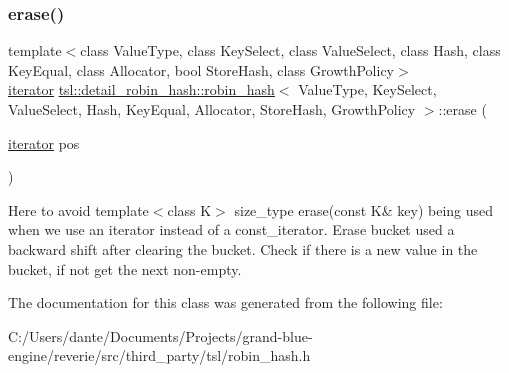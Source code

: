 \subsubsection{\texorpdfstring{erase()}{erase()}}
{\footnotesize\ttfamily template$<$class Value\+Type, class Key\+Select, class Value\+Select, class Hash, class Key\+Equal, class Allocator, bool Store\+Hash, class Growth\+Policy$>$ \\
\mbox{\hyperlink{classtsl_1_1detail__robin__hash_1_1robin__hash_1_1robin__iterator}{iterator}} \mbox{\hyperlink{classtsl_1_1detail__robin__hash_1_1robin__hash}{tsl\+::detail\+\_\+robin\+\_\+hash\+::robin\+\_\+hash}}$<$ Value\+Type, Key\+Select, Value\+Select, Hash, Key\+Equal, Allocator, Store\+Hash, Growth\+Policy $>$\+::erase (\begin{DoxyParamCaption}\item[{\mbox{\hyperlink{classtsl_1_1detail__robin__hash_1_1robin__hash_1_1robin__iterator}{iterator}}}]{pos }\end{DoxyParamCaption})\hspace{0.3cm}{\ttfamily [inline]}}

Here to avoid {\ttfamily template$<$class K$>$ size\+\_\+type erase(const K\& key)} being used when we use an {\ttfamily iterator} instead of a {\ttfamily const\+\_\+iterator}. Erase bucket used a backward shift after clearing the bucket. Check if there is a new value in the bucket, if not get the next non-\/empty.

The documentation for this class was generated from the following file\+:\begin{DoxyCompactItemize}
\item 
C\+:/\+Users/dante/\+Documents/\+Projects/grand-\/blue-\/engine/reverie/src/third\+\_\+party/tsl/robin\+\_\+hash.\+h\end{DoxyCompactItemize}

